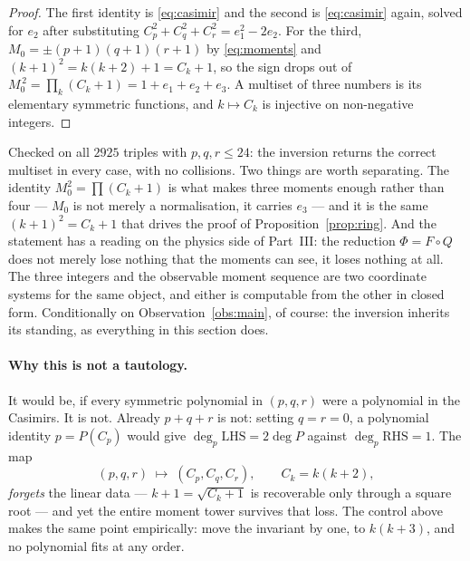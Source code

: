 \documentclass[11pt,a4paper]{article}
\begin{document}
\begin{proof}
The first identity is \eqref{eq:casimir} and the second is \eqref{eq:casimir} again, solved for
$e_2$ after substituting $C_p^2+C_q^2+C_r^2=e_1^2-2e_2$. For the third,
$M_0=\pm(p{+}1)(q{+}1)(r{+}1)$ by \eqref{eq:moments} and $(k+1)^2=k(k+2)+1=C_k+1$, so the sign
drops out of $M_0^{\,2}=\prod_k(C_k+1)=1+e_1+e_2+e_3$. A multiset of three numbers is its
elementary symmetric functions, and $k\mapsto C_k$ is injective on non-negative integers.
\end{proof}

\noindent Checked on all $2925$ triples with $p,q,r\le24$: the inversion returns the correct
multiset in every case, with no collisions. Two things are worth separating. The identity
$M_0^2=\prod(C_k+1)$ is what makes three moments enough rather than four --- $M_0$ is not merely a
normalisation, it carries $e_3$ --- and it is the same $(k+1)^2=C_k+1$ that drives the proof of
Proposition~\ref{prop:ring}. And the statement has a reading on the physics side of Part~III: the
reduction $\Phi=F\circ Q$ does not merely lose nothing that the moments can see, it loses nothing
at all. The three integers and the observable moment sequence are two coordinate systems for the
same object, and either is computable from the other in closed form. Conditionally on
Observation~\ref{obs:main}, of course: the inversion inherits its standing, as everything in this
section does.

\paragraph{Why this is not a tautology.} It would be, if every symmetric polynomial in
$(p,q,r)$ were a polynomial in the Casimirs. It is not. Already $p+q+r$ is not: setting
$q=r=0$, a polynomial identity $p=P(C_p)$ would give $\deg_p\text{LHS}=2\deg P$ against
$\deg_p\text{RHS}=1$. The map
\[
(p,q,r)\;\longmapsto\;(C_p,C_q,C_r),\qquad C_k=k(k+2),
\]
\emph{forgets} the linear data --- $k+1=\sqrt{C_k+1}$ is recoverable only through a square root
--- and yet the entire moment tower survives that loss. The control above makes the same point
empirically: move the invariant by one, to $k(k+3)$, and no polynomial fits at any order.
\end{document}
